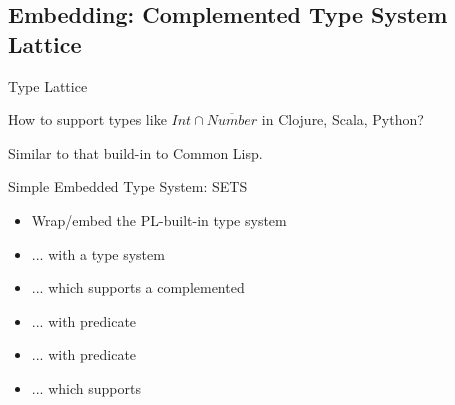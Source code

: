 \subsection{Embedding: Complemented Type System Lattice}

{  
\begin{frame}{ Type Lattice}

  How to support types like \textcolor{greeny}{$Int\cap\overline{Number}$} in Clojure, Scala, Python?

  Similar to that build-in to  Common Lisp.


\end{frame}
}

\begin{frame}{Simple Embedded Type System: SETS}

  \begin{itemize}
  \item Wrap/embed the PL-built-in type system
  \item ... with a  type system
  \item ... which supports a complemented 
  \item ... with  predicate
  \item ... with  predicate
  \item ... which supports 
  \end{itemize}

\end{frame}


\newsavebox\tdast
\begin{lrbox}{\tdast}
  \begin{minipage}{11cm}
    
  \end{minipage}
\end{lrbox}


